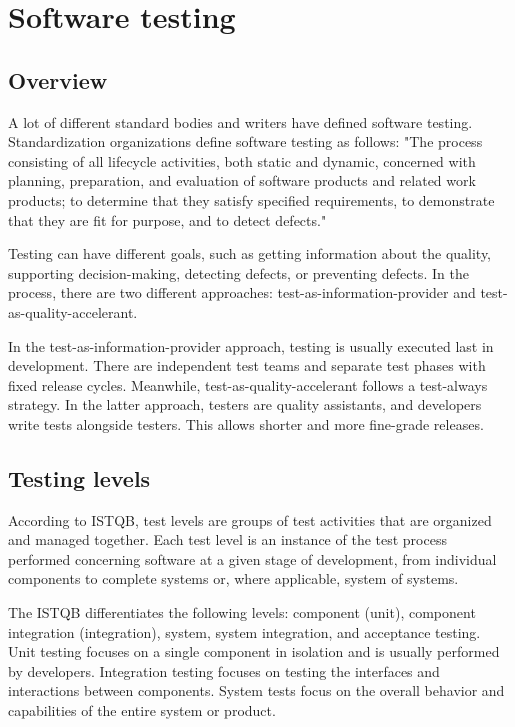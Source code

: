 \section{Software testing}
\label{chap:testing}
\subsection{Overview}
A lot of different standard bodies and writers have defined software testing.
Standardization organizations define software testing
as follows: "The process consisting of all lifecycle activities, both static and
dynamic, concerned with planning, preparation, and evaluation of software products and
related work products; to determine that they satisfy specified requirements,
to demonstrate that they are fit for purpose, and to detect defects." \cite{ctfl_syllabus:2023}

Testing can have different goals, such as getting information about the quality,
supporting decision-making, detecting defects, or preventing defects.
In the process, there are two different approaches: test-as-information-provider
and test-as-quality-accelerant.

In the test-as-information-provider approach, testing is usually executed last in development.
There are independent test teams and separate test phases with fixed release cycles.
Meanwhile, test-as-quality-accelerant follows a test-always strategy.
In the latter approach, testers are quality assistants, and developers
write tests alongside testers.
This allows shorter and more fine-grade releases.
\subsection{Testing levels}

According to ISTQB, test levels are groups of test activities that are organized
and managed together.
Each test level is an instance of the test process performed concerning
software at a given stage of development, from individual components to complete
systems or, where applicable, system of systems. \cite{ctfl_syllabus:2023}

The ISTQB differentiates the following levels: component (unit), component integration (integration), system, system integration, and acceptance testing. Unit testing focuses on a single component in isolation and is usually performed by developers. Integration testing focuses on testing the interfaces and interactions between components. System tests focus on the overall behavior and capabilities of the entire system or product.

